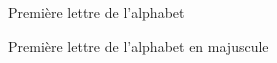 \item [$\textbf{a}$] Première lettre de l'alphabet
\item [$\textbf{A}$] Première lettre de l'alphabet en majuscule